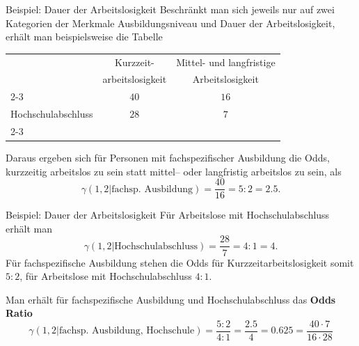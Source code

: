 \documentclass[
  10pt,
  ignorenonframetext,
]{beamer}
\begin{document}
\begin{frame}{Beispiel: Dauer der Arbeitslosigkeit}
\protect\hypertarget{beispiel-dauer-der-arbeitslosigkeit}{}
Beschränkt man sich jeweils nur auf zwei Kategorien der Merkmale
Ausbildungsniveau und Dauer der Arbeitslosigkeit, erhält man
beispielsweise die Tabelle

\begin{center}
\small
\begin{tabular}[b]{lcc}
\multicolumn{1}{c}{}
& Kurzzeit-
  & Mittel- und langfristige\\
\multicolumn{1}{c}{}
& arbeitslosigkeit
  & Arbeitslosigkeit\\\cline{2-3}
\multicolumn{1}{l|}{Fachspezifische Ausbildung}
& $40$ & \multicolumn{1}{c|}{$16$} \\
\multicolumn{1}{l|}{Hochschulabschluss}
& $28$ & \multicolumn{1}{c|}{$7$}\\\cline{2-3}
\end{tabular}
\end{center}

\medskip Daraus ergeben sich für Personen mit fachspezifischer
Ausbildung die Odds, kurzzeitig arbeitslos zu sein statt mittel-- oder
langfristig arbeitslos zu sein, als \begin{displaymath}
\gamma(1,2|\text{fachsp. Ausbildung}) = \frac{40}{16} = 5:2 = 2.5.
\end{displaymath}
\end{frame}

\begin{frame}{Beispiel: Dauer der Arbeitslosigkeit}
\protect\hypertarget{beispiel-dauer-der-arbeitslosigkeit-1}{}
Für Arbeitslose mit Hochschulabschluss erhält man \begin{displaymath}
\gamma(1,2|\text{Hochschulabschluss}) = \frac{28}{7} = 4:1 = 4.
\end{displaymath} Für fachspezifische Ausbildung stehen die Odds für
Kurzzeitarbeitslosigkeit somit \(5:2\), für Arbeitslose mit
Hochschulabschluss \(4:1\).

\vspace{0.5cm}

Man erhält für fachspezifische Ausbildung und Hochschulabschluss das
\textbf{Odds Ratio} \begin{displaymath}
\gamma(1,2|\text{fachsp. Ausbildung, Hochschule}) = \frac{5:2}{4:1} = \frac{2.5}{4} = 0.625 =
\frac{40\cdot 7}{16 \cdot 28}
\end{displaymath}
\end{frame}
\end{document}
